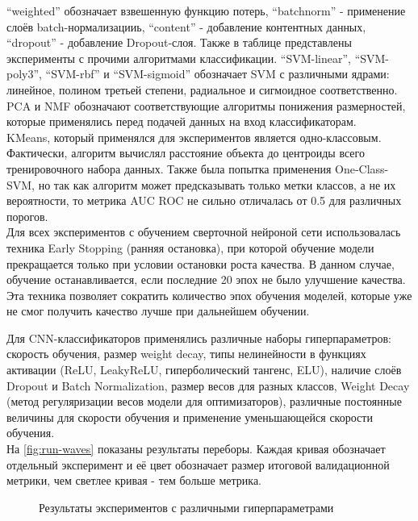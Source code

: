 ``weighted'' обозначает взвешенную функцию потерь, ``batchnorm'' - применение слоёв batch-нормализацииь, ``content'' - добавление контентных данных, ``dropout'' - добавление Dropout-слоя. Также в таблице представлены эксперименты с прочими алгоритмами классификации. ``SVM-linear'', ``SVM-poly3'', ``SVM-rbf'' и ``SVM-sigmoid'' обозначает SVM с различными ядрами: линейное, полином третьей степени, радиальное и сигмоидное соответственно. PCA и NMF обозначают соответствующие алгоритмы понижения размерностей, которые применялись перед подачей данных на вход классификаторам. \\
KMeans, который применялся для экспериментов является одно-классовым. Фактически, алгоритм вычислял расстояние объекта до центроиды всего тренировочного набора данных. Также была попытка применения One-Class-SVM, но так как алгоритм может предсказывать только метки классов, а не их вероятности, то метрика AUC ROC не сильно отличалась от 0.5 для различных порогов.\\

Для всех экспериментов с обучением сверточной нейроной сети использовалась техника Early Stopping (ранняя остановка), при которой обучение модели прекращается только при условии остановки роста качества. В данном случае, обучение останавливается, если последние 20 эпох не было улучшение качества. Эта техника позволяет сократить количество эпох обучения моделей, которые уже не смог получить качество лучше при дальнейшем обучении.

Для CNN-классификаторов применялись различные наборы гиперпараметров: скорость обучения, размер weight decay, типы нелинейности в функциях активации (ReLU, LeakyReLU, гиперболический тангенс, ELU), наличие слоёв Dropout и Batch Normalization, размер весов для разных классов, Weight Decay (метод регуляризации весов модели для оптимизаторов), различные постоянные величины для скорости обучения и применение уменьшающейся скорости обучения.\\

На \autoref{fig:run-waves} показаны результаты переборы. Каждая кривая обозначает отдельный эксперимент и её цвет обозначает размер итоговой валидационной метрики, чем светлее кривая - тем больше метрика.

\begin{figure}[ht]
\noindent{}
\caption{Результаты экспериментов с различными гиперпараметрами}
\label{fig:run-waves}
\end{figure}

